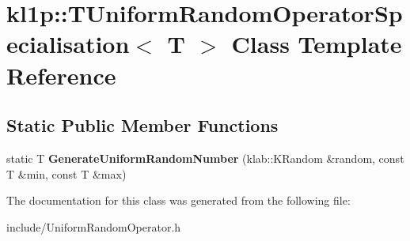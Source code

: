 \hypertarget{classkl1p_1_1TUniformRandomOperatorSpecialisation}{}\section{kl1p\+:\+:T\+Uniform\+Random\+Operator\+Specialisation$<$ T $>$ Class Template Reference}
\label{classkl1p_1_1TUniformRandomOperatorSpecialisation}
\subsection*{Static Public Member Functions}
\begin{DoxyCompactItemize}
\item 
static T {\bfseries Generate\+Uniform\+Random\+Number} (klab\+::\+K\+Random \&random, const T \&min, const T \&max)\hypertarget{classkl1p_1_1TUniformRandomOperatorSpecialisation_a22889a0f9831c057d1308d45f7932320}{}\label{classkl1p_1_1TUniformRandomOperatorSpecialisation_a22889a0f9831c057d1308d45f7932320}

\end{DoxyCompactItemize}


The documentation for this class was generated from the following file\+:\begin{DoxyCompactItemize}
\item 
include/Uniform\+Random\+Operator.\+h\end{DoxyCompactItemize}
